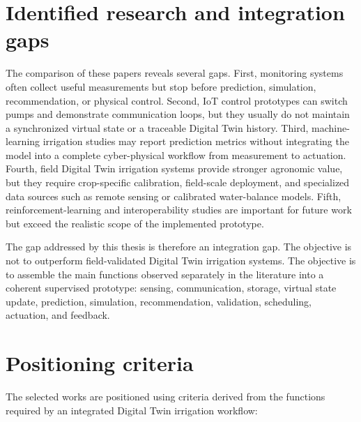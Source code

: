 \section{Identified research and integration gaps}

The comparison of these papers reveals several gaps. First, monitoring systems often collect useful measurements but stop before prediction, simulation, recommendation, or physical control. Second, IoT control prototypes can switch pumps and demonstrate communication loops, but they usually do not maintain a synchronized virtual state or a traceable Digital Twin history. Third, machine-learning irrigation studies may report prediction metrics without integrating the model into a complete cyber-physical workflow from measurement to actuation. Fourth, field Digital Twin irrigation systems provide stronger agronomic value, but they require crop-specific calibration, field-scale deployment, and specialized data sources such as remote sensing or calibrated water-balance models. Fifth, reinforcement-learning and interoperability studies are important for future work but exceed the realistic scope of the implemented prototype.

The gap addressed by this thesis is therefore an integration gap. The objective is not to outperform field-validated Digital Twin irrigation systems. The objective is to assemble the main functions observed separately in the literature into a coherent supervised prototype: sensing, communication, storage, virtual state update, prediction, simulation, recommendation, validation, scheduling, actuation, and feedback.

\section{Positioning criteria}

The selected works are positioned using criteria derived from the functions required by an integrated Digital Twin irrigation workflow:

